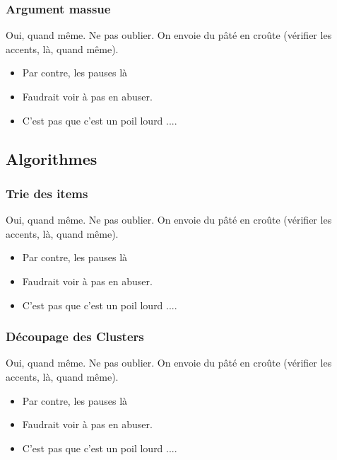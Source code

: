 \documentclass{polytech-presentation}
\begin{document}
	\begin{frame}
	\frametitle{Argument massue}
				
		\begin{block}{Oui, quand même.}
					Ne pas oublier. On envoie du pâté en croûte (vérifier les accents, là, quand même).
		\end{block}
				
		\begin{itemize}
			\item Par contre, les pauses là \pause
			\item Faudrait voir à pas en abuser. \pause
			\item C'est pas que c'est un poil lourd ....
		\end{itemize}
				
	\end{frame}		
	
			\subsection{Algorithmes}
			
	\begin{frame}
	\frametitle{Trie des items}
				
		\begin{block}{Oui, quand même.}
					Ne pas oublier. On envoie du pâté en croûte (vérifier les accents, là, quand même).
		\end{block}
				
		\begin{itemize}
			\item Par contre, les pauses là \pause
			\item Faudrait voir à pas en abuser. \pause
			\item C'est pas que c'est un poil lourd ....
		\end{itemize}
				
	\end{frame}	
	
		\begin{frame}
	\frametitle{Découpage des Clusters}
				
		\begin{block}{Oui, quand même.}
					Ne pas oublier. On envoie du pâté en croûte (vérifier les accents, là, quand même).
		\end{block}
				
		\begin{itemize}
			\item Par contre, les pauses là \pause
			\item Faudrait voir à pas en abuser. \pause
			\item C'est pas que c'est un poil lourd ....
		\end{itemize}
				
	\end{frame}
\end{document}
